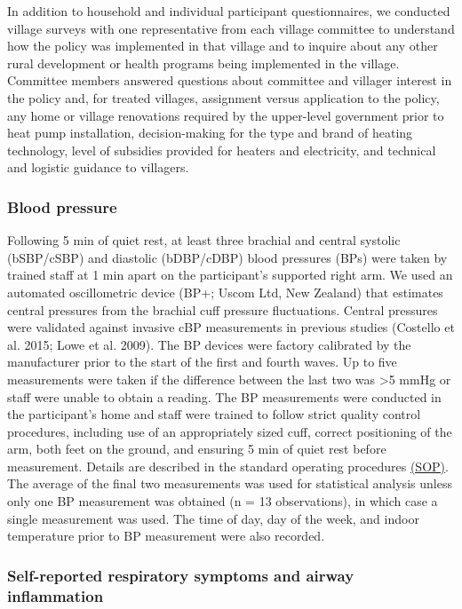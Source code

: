 \documentclass[
  letterpaper,
  DIV=11,
  numbers=noendperiod]{scrartcl}
\begin{document}
In addition to household and individual participant questionnaires, we
conducted village surveys with one representative from each village
committee to understand how the policy was implemented in that village
and to inquire about any other rural development or health programs
being implemented in the village. Committee members answered questions
about committee and villager interest in the policy and, for treated
villages, assignment versus application to the policy, any home or
village renovations required by the upper-level government prior to heat
pump installation, decision-making for the type and brand of heating
technology, level of subsidies provided for heaters and electricity, and
technical and logistic guidance to villagers.

\hypertarget{blood-pressure}{%
\subsubsection{Blood pressure}\label{blood-pressure}}

Following 5 min of quiet rest, at least three brachial and central
systolic (bSBP/cSBP) and diastolic (bDBP/cDBP) blood pressures (BPs)
were taken by trained staff at 1 min apart on the participant's
supported right arm. We used an automated oscillometric device (BP+;
Uscom Ltd, New Zealand) that estimates central pressures from the
brachial cuff pressure fluctuations. Central pressures were validated
against invasive cBP measurements in previous studies (Costello et al.
2015; Lowe et al. 2009). The BP devices were factory calibrated by the
manufacturer prior to the start of the first and fourth waves. Up to
five measurements were taken if the difference between the last two was
\textgreater5 mmHg or staff were unable to obtain a reading. The BP
measurements were conducted in the participant's home and staff were
trained to follow strict quality control procedures, including use of an
appropriately sized cuff, correct positioning of the arm, both feet on
the ground, and ensuring 5 min of quiet rest before measurement. Details
are described in the standard operating procedures
\href{https://osf.io/gmka5}{(SOP)}. The average of the final two
measurements was used for statistical analysis unless only one BP
measurement was obtained (n = 13 observations), in which case a single
measurement was used. The time of day, day of the week, and indoor
temperature prior to BP measurement were also recorded.

\hypertarget{self-reported-respiratory-symptoms-and-airway-inflammation}{%
\subsubsection{Self-reported respiratory symptoms and airway
inflammation}\label{self-reported-respiratory-symptoms-and-airway-inflammation}}
\end{document}
